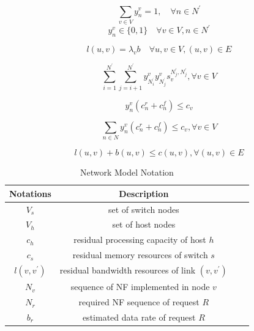 \documentclass[10pt, conference, letterpaper]{IEEEtran}
\begin{document}
\begin{equation}
\sum_{v \in V} y_{n}^{v}=1, \quad \forall n \in N^{\prime}\label{2}
\end{equation}
\begin{equation}
y_{n}^{v} \in\{0,1\} \quad \forall v \in V, n \in N^{\prime} \label{3}
\end{equation}

\begin{equation}
l(u, v)=\lambda_{v} b \quad \forall u, v \in V,(u, v) \in E\label{4}
\end{equation}

\begin{equation}
\sum_{i=1}^{N^{\prime}} \sum_{j=i+1}^{N^{\prime}} y_{N_{i}^{^{\prime}}}^{v} y_{N_{j}^{^{\prime}}}^{v} s_{v}^{N_{j}^{\prime}, N_{j}^{\prime}}, \forall v \in V\label{5}
\end{equation}

\begin{equation}
y_{n}^{v}(c_{n}^r + c_{n}^f) \leqslant c_{v} \label{6}
\end{equation}

\begin{equation}
\sum_{n \in N} y_{n}^{v}(c_{n}^r + c_{n}^f) \leqslant c_{v}, \forall v \in V \label{7}
\end{equation}

\begin{equation}
l(u, v) + b(u, v) \leqslant c(u, v), \forall (u, v) \in E \label{8}
\end{equation}



\begin{table}[htbp]
\caption{Network Model Notation}
\begin{center}
\begin{tabular}{|c|c|c|c|}
\hline
\textbf{Notations}&\textbf{Description}\\
\hline
$V_{s}$ & set of switch nodes\\
\hline
$V_{h}$ & set of host nodes\\
\hline
$c_{h}$ & residual processing capacity of host $h$\\
\hline
$c_{s}$ & residual memory resources of switch $s$\\
\hline
$l(v, v^{\prime})$ & residual bandwidth resources of link  $(v, v^{\prime})$\\
\hline
$N_v$ & sequence of NF implemented in node $v$\\
\hline
$N_r$ & required NF sequence of request $R$\\
\hline
$b_r$ & estimated data rate of request $R$\\
\hline
\end{tabular}
\label{notation}
\end{center}
\end{table}
\end{document}
